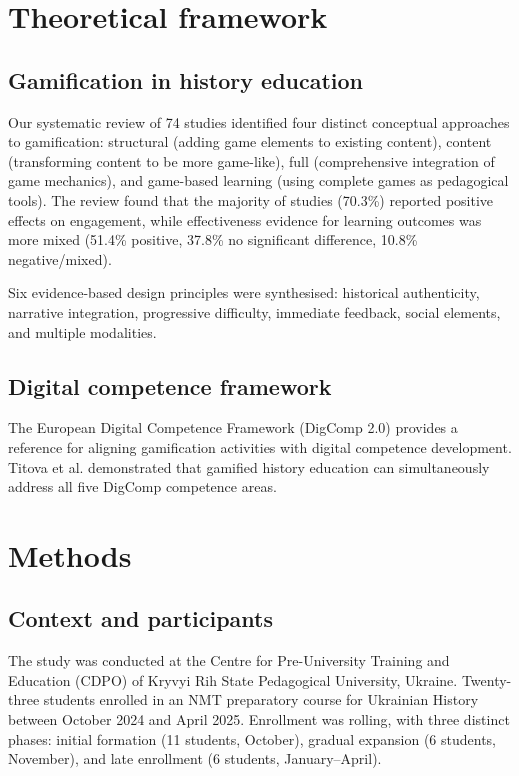 \documentclass[review]{elsarticle}
\begin{document}
\section{Theoretical framework}

\subsection{Gamification in history education}

Our systematic review of 74 studies \citep{KorniienkoSemerikov2024} identified four distinct conceptual approaches to gamification: structural (adding game elements to existing content), content (transforming content to be more game-like), full (comprehensive integration of game mechanics), and game-based learning (using complete games as pedagogical tools). The review found that the majority of studies (70.3\%) reported positive effects on engagement, while effectiveness evidence for learning outcomes was more mixed (51.4\% positive, 37.8\% no significant difference, 10.8\% negative/mixed).

Six evidence-based design principles were synthesised: historical authenticity, narrative integration, progressive difficulty, immediate feedback, social elements, and multiple modalities.

\subsection{Digital competence framework}

The European Digital Competence Framework (DigComp 2.0) \citep{Vuorikari2016} provides a reference for aligning gamification activities with digital competence development. Titova et al. \citep{Titova2025cte} demonstrated that gamified history education can simultaneously address all five DigComp competence areas.


\section{Methods}

\subsection{Context and participants}

The study was conducted at the Centre for Pre-University Training and Education (CDPO) of Kryvyi Rih State Pedagogical University, Ukraine. Twenty-three students enrolled in an NMT preparatory course for Ukrainian History between October 2024 and April 2025. Enrollment was rolling, with three distinct phases: initial formation (11 students, October), gradual expansion (6 students, November), and late enrollment (6 students, January--April).
\end{document}
